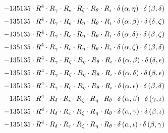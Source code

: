 \begin{subequations}
\begin{gather}
 \\[0.2em] \notag 		 - 135135 \cdot R^{4} \cdot R_{\gamma{}} \cdot R_{\epsilon{}} \cdot R_{\zeta{}} \cdot R_{\theta{}} \cdot R_{\iota{}} \cdot \delta{}\left(\alpha{}, \eta{}\right) \cdot \delta{}\left(\beta{}, \delta{}\right) 
 \\[0.2em] \notag 		 - 135135 \cdot R^{4} \cdot R_{\gamma{}} \cdot R_{\epsilon{}} \cdot R_{\eta{}} \cdot R_{\theta{}} \cdot R_{\iota{}} \cdot \delta{}\left(\alpha{}, \beta{}\right) \cdot \delta{}\left(\delta{}, \zeta{}\right) 
 \\[0.2em] \notag 		 - 135135 \cdot R^{4} \cdot R_{\gamma{}} \cdot R_{\epsilon{}} \cdot R_{\eta{}} \cdot R_{\theta{}} \cdot R_{\iota{}} \cdot \delta{}\left(\alpha{}, \delta{}\right) \cdot \delta{}\left(\beta{}, \zeta{}\right) 
 \\[0.2em] \notag 		 - 135135 \cdot R^{4} \cdot R_{\gamma{}} \cdot R_{\epsilon{}} \cdot R_{\eta{}} \cdot R_{\theta{}} \cdot R_{\iota{}} \cdot \delta{}\left(\alpha{}, \zeta{}\right) \cdot \delta{}\left(\beta{}, \delta{}\right) 
 \\[0.2em] \notag 		 - 135135 \cdot R^{4} \cdot R_{\gamma{}} \cdot R_{\zeta{}} \cdot R_{\eta{}} \cdot R_{\theta{}} \cdot R_{\iota{}} \cdot \delta{}\left(\alpha{}, \beta{}\right) \cdot \delta{}\left(\delta{}, \epsilon{}\right) 
 \\[0.2em] \notag 		 - 135135 \cdot R^{4} \cdot R_{\gamma{}} \cdot R_{\zeta{}} \cdot R_{\eta{}} \cdot R_{\theta{}} \cdot R_{\iota{}} \cdot \delta{}\left(\alpha{}, \delta{}\right) \cdot \delta{}\left(\beta{}, \epsilon{}\right) 
 \\[0.2em] \notag 		 - 135135 \cdot R^{4} \cdot R_{\gamma{}} \cdot R_{\zeta{}} \cdot R_{\eta{}} \cdot R_{\theta{}} \cdot R_{\iota{}} \cdot \delta{}\left(\alpha{}, \epsilon{}\right) \cdot \delta{}\left(\beta{}, \delta{}\right) 
 \\[0.2em] \notag 		 - 135135 \cdot R^{4} \cdot R_{\delta{}} \cdot R_{\epsilon{}} \cdot R_{\zeta{}} \cdot R_{\eta{}} \cdot R_{\theta{}} \cdot \delta{}\left(\alpha{}, \beta{}\right) \cdot \delta{}\left(\gamma{}, \iota{}\right) 
 \\[0.2em] \notag 		 - 135135 \cdot R^{4} \cdot R_{\delta{}} \cdot R_{\epsilon{}} \cdot R_{\zeta{}} \cdot R_{\eta{}} \cdot R_{\theta{}} \cdot \delta{}\left(\alpha{}, \gamma{}\right) \cdot \delta{}\left(\beta{}, \iota{}\right) 
 \\[0.2em] \notag 		 - 135135 \cdot R^{4} \cdot R_{\delta{}} \cdot R_{\epsilon{}} \cdot R_{\zeta{}} \cdot R_{\eta{}} \cdot R_{\theta{}} \cdot \delta{}\left(\alpha{}, \iota{}\right) \cdot \delta{}\left(\beta{}, \gamma{}\right) 

\end{gather}
\end{subequations}
